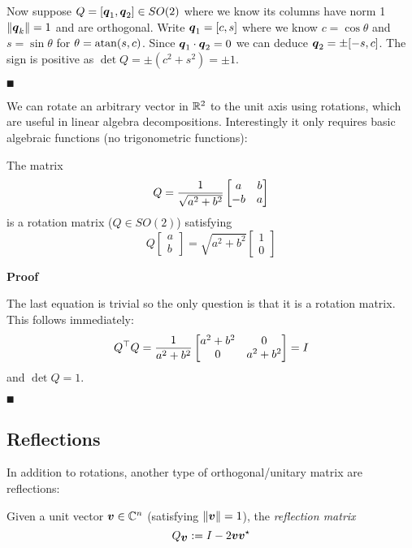 Now suppose $Q = [\bm{{\mbox{\boldmath$q$\unboldmath}}}_1, \bm{{\mbox{\boldmath$q$\unboldmath}}}_2] \in SO(2)$ where we know its columns have norm 1 $\|\bm{{\mbox{\boldmath$q$\unboldmath}}}_k\| = 1$ and are orthogonal. Write $\bm{{\mbox{\boldmath$q$\unboldmath}}}_1 = [c,s]$ where we know $c = \cos \ensuremath{\theta}$ and $s = \sin \ensuremath{\theta}$ for $\ensuremath{\theta} = {\rm atan}(s, c)$.  Since $\bm{{\mbox{\boldmath$q$\unboldmath}}}_1\cdot \bm{{\mbox{\boldmath$q$\unboldmath}}}_2 = 0$ we can deduce $\bm{{\mbox{\boldmath$q$\unboldmath}}}_2 = \pm [-s,c]$. The sign is positive as $\det Q = \ensuremath{\pm}(c^2 + s^2) = \ensuremath{\pm}1$.

\ensuremath{\QED}

We can rotate an arbitrary vector in ${\mathbb R}^2$ to the unit axis using rotations, which are useful in linear algebra decompositions. Interestingly it only requires basic algebraic functions (no trigonometric functions):

\begin{proposition}  The matrix
\[
Q = {1 \over \sqrt{a^2 + b^2}}
\begin{bmatrix}
 a & b \cr -b & a
\end{bmatrix}
\]
is a rotation matrix ($Q \ensuremath{\in} SO(2)$) satisfying
\[
Q \begin{bmatrix} a \\ b \end{bmatrix} = \sqrt{a^2 + b^2} \begin{bmatrix} 1 \\ 0 \end{bmatrix}
\]
\end{proposition}
\textbf{Proof} 

The last equation is trivial so the only question is that it is a rotation matrix. This follows immediately:
\[
Q^\ensuremath{\top} Q = {1 \over a^2 + b^2}  \begin{bmatrix}
 a^2 + b^2 & 0 \cr 0 & a^2 + b^2
\end{bmatrix} = I
\]
and $\det Q = 1$.

\ensuremath{\QED}

\subsection{Reflections}
In addition to rotations, another type of orthogonal/unitary matrix are reflections:

\begin{definition}  Given a unit vector $\bm{{\mbox{\boldmath$v$\unboldmath}}} \in {\mathbb C}^n$ (satisfying $\|\bm{{\mbox{\boldmath$v$\unboldmath}}}\|=1$), the \emph{reflection matrix}
\[
Q_{\bm{{\mbox{\boldmath$v$\unboldmath}}}} := I - 2 \bm{{\mbox{\boldmath$v$\unboldmath}}} \bm{{\mbox{\boldmath$v$\unboldmath}}}^\star
\]
\end{definition}

